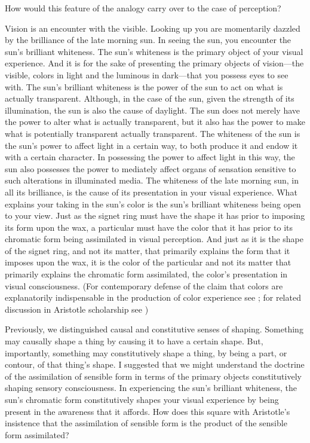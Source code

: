 How would this feature of the analogy carry over to the case of perception?

Vision is an encounter with the visible. Looking up you are momentarily dazzled by the brilliance of the late morning sun. In seeing the sun, you encounter the sun's brilliant whiteness. The sun's whiteness is the primary object of your visual experience. And it is for the sake of presenting the primary objects of vision---the visible, colors in light and the luminous in dark---that you possess eyes to see with. The sun's brilliant whiteness is the power of the sun to act on what is actually transparent. Although, in the case of the sun, given the strength of its illumination, the sun is also the cause of daylight. The sun does not merely have the power to alter what is actually transparent, but it also has the power to make what is potentially transparent actually transparent. The whiteness of the sun is the sun's power to affect light in a certain way, to both produce it and endow it with a certain character. In possessing the power to affect light in this way, the sun also possesses the power to mediately affect organs of sensation sensitive to such alterations in illuminated media. The whiteness of the late morning sun, in all its brilliance, is the cause of its presentation in your visual experience. What explains your taking in the sun's color is the sun's brilliant whiteness being open to your view. Just as the signet ring must have the shape it has prior to imposing its form upon the wax, a particular must have the color that it has prior to its chromatic form being assimilated in visual perception. And just as it is the shape of the signet ring, and not its matter, that primarily explains the form that it imposes upon the wax, it is the color of the particular and not its matter that primarily explains the chromatic form assimilated, the color's presentation in visual consciousness. (For contemporary defense of the claim that colors are explanatorily indispensable in the production of color experience see \citealt{Campbell:1997dq,Broackes:1997pa}; for related discussion in Aristotle scholarship see \citealt{Broadie:1993fk,Broackes:1999uq})

Previously, we distinguished causal and constitutive senses of shaping. Something may causally shape a thing by causing it to have a certain shape. But, importantly, something may constitutively shape a thing, by being a part, or contour, of that thing's shape. I suggested that we might understand the doctrine of the assimilation of sensible form in terms of the primary objects constitutively shaping sensory consciousness. In experiencing the sun's brilliant whiteness, the sun's chromatic form constitutively shapes your visual experience by being present in the awareness that it affords. How does this square with Aristotle's insistence that the assimilation of sensible form is the product of the sensible form assimilated?

